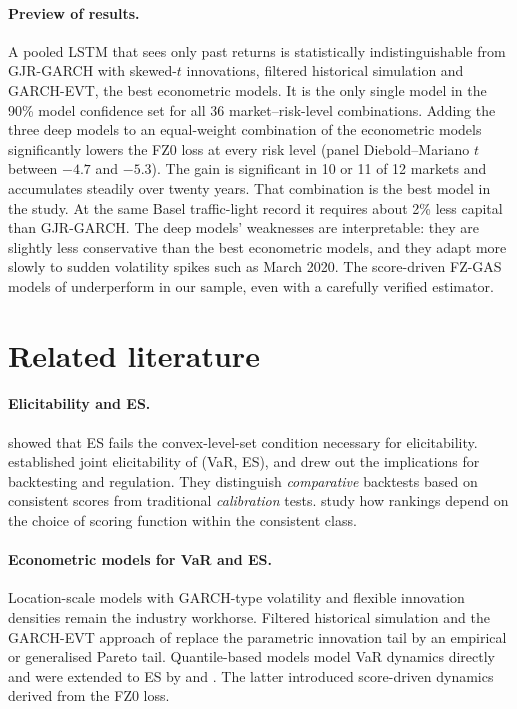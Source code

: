 \documentclass[11pt]{article}
\theoremstyle{remark}
\newcommand{\1}{\mathbf{1}}
\begin{document}
\paragraph{Preview of results.} A pooled LSTM that sees only past returns is statistically indistinguishable from GJR-GARCH with skewed-$t$ innovations, filtered historical simulation and GARCH-EVT, the best econometric models. It is the only single model in the 90\% model confidence set for all 36 market--risk-level combinations. Adding the three deep models to an equal-weight combination of the econometric models significantly lowers the FZ0 loss at every risk level (panel Diebold--Mariano $t$ between $-4.7$ and $-5.3$). The gain is significant in 10 or 11 of 12 markets and accumulates steadily over twenty years. That combination is the best model in the study. At the same Basel traffic-light record it requires about 2\% less capital than GJR-GARCH. The deep models' weaknesses are interpretable: they are slightly less conservative than the best econometric models, and they adapt more slowly to sudden volatility spikes such as March 2020. The score-driven FZ-GAS models of \citet{patton2019dynamic} underperform in our sample, even with a carefully verified estimator.

\section{Related literature}\label{sec:lit}

\paragraph{Elicitability and ES.} \citet{gneiting2011making} showed that ES fails the convex-level-set condition necessary for elicitability. \citet{fissler2016higher} established joint elicitability of (VaR, ES), and \citet{nolde2017elicitability} drew out the implications for backtesting and regulation. They distinguish \emph{comparative} backtests based on consistent scores from traditional \emph{calibration} tests. \citet{ziegel2020robust} study how rankings depend on the choice of scoring function within the consistent class.

\paragraph{Econometric models for VaR and ES.} Location-scale models with GARCH-type volatility \citep{bollerslev1986garch,glosten1993relation} and flexible innovation densities \citep{hansen1994autoregressive} remain the industry workhorse. Filtered historical simulation \citep{baroneadesi1999var} and the GARCH-EVT approach of \citet{mcneil2000estimation} replace the parametric innovation tail by an empirical or generalised Pareto tail. Quantile-based models model VaR dynamics directly \citep{engle2004caviar} and were extended to ES by \citet{taylor2019forecasting} and \citet{patton2019dynamic}. The latter introduced score-driven \citep{creal2013generalized} dynamics derived from the FZ0 loss.
\end{document}
